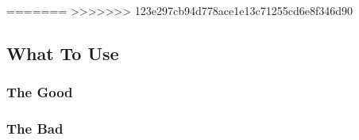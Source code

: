 
=======
>>>>>>> 123e297cb94d778ace1e13c71255cd6e8f346d90
\subsection{What To Use}


\subsubsection{The Good}


\subsubsection{The Bad}

